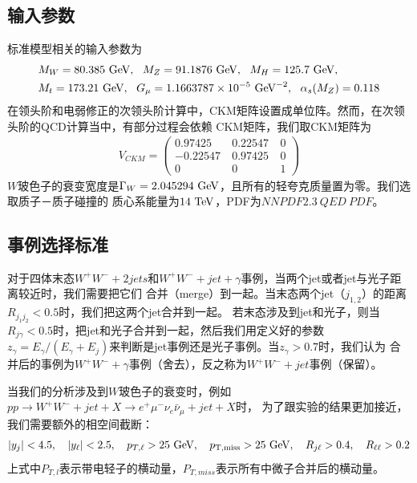 \subsection{输入参数}
标准模型相关的输入参数为\cite{pdg2014}
\begin{equation}
\begin{split}
& M_W = 80.385~{\rm GeV},~~ M_Z = 91.1876~{\rm GeV},~~ M_H = 125.7~{\rm GeV}, \nonumber \\
& M_t=173.21~{\rm GeV},~~ G_{\mu} = 1.1663787 \times 10^{-5}~{\rm GeV}^{-2},~~ \alpha_s(M_Z) = 0.118
\end{split}
\label{eq:SMpar}
\end{equation}
在领头阶和电弱修正的次领头阶计算中，CKM矩阵设置成单位阵。然而，在次领头阶的QCD计算当中，有部分过程会依赖
CKM矩阵，我们取CKM矩阵为
\begin{eqnarray}\label{CKM}
 V_{CKM} = \left(
\begin{array}{rcc}
     0.97425 \ &  0.22547 \ &  0 \\
    -0.22547 \ &  0.97425 \ &  0 \\
       0~~~~ \ &  0 \ &  1
\end{array}  \right)
\end{eqnarray}
$W$玻色子的衰变宽度是$\Gamma_W = 2.045294~\rm{GeV}$，且所有的轻夸克质量置为零。我们选取质子－质子碰撞的
质心系能量为$14~\rm{TeV}$，PDF为$NNPDF2.3~QED~PDF$\cite{NNPDF}。

\subsection{事例选择标准}
对于四体末态$W^+W^-+2jets$和$W^+W^-+jet+\gamma$事例，当两个jet或者jet与光子距离较近时，我们需要把它们
合并（merge）到一起。当末态两个jet（$j_{1,2}$）的距离$R_{j_1j_2}< 0.5$时，我们把这两个jet合并到一起。
若末态涉及到jet和光子，则当$R_{j\gamma} < 0.5$时，把jet和光子合并到一起，然后我们用定义好的参数
$z_{\gamma} = E_{\gamma}/(E_{\gamma}+E_j)$来判断是jet事例还是光子事例。当$z_{\gamma} > 0.7$时，我们认为
合并后的事例为$W^+W^-+\gamma$事例（舍去），反之称为$W^+W^-+jet$事例（保留）。

当我们的分析涉及到$W$玻色子的衰变时，例如$pp\to W^+W^-+jet+X\to e^+\mu^-\nu_e\bar{\nu}_{\mu}+jet+X$时，
为了跟实验的结果更加接近，我们需要额外的相空间截断：
\begin{eqnarray}
\label{eqn:finalcut1}
|y_j| < 4.5,\quad |y_{\ell}| < 2.5, \quad p_{T,\ell} > 25~{\rm GeV},\quad p_{\textrm{T}, {\rm miss}} > 25~{\rm GeV}, \quad R_{j\ell} > 0.4, \quad R_{\ell \ell} > 0.2 
\nonumber \\
\end{eqnarray}
上式中$P_{T,l}$表示带电轻子的横动量，$P_{T,miss}$表示所有中微子合并后的横动量。

